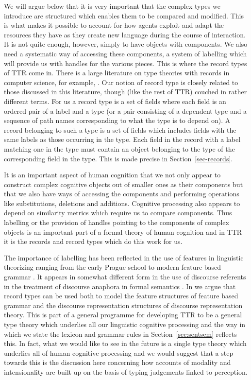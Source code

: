We will argue below that it is very important that the complex types
we introduce are structured which enables them to be compared and
modified.  This is what makes it possible to account for how agents
exploit and adapt the resources they have as they create new language
during the course of interaction.  It is not quite enough, however, simply
to have objects with components.  We also need a systematic way of
accessing these components, a system of labelling which will provide
us with handles for the various pieces.  This is where the record
types of TTR come in.  There is a large literature on type theories
with records in computer science, for example,
\cite{Tasistro1997,Betarte1998,BetarteTasistro1998,CoquandPollackTakeyama2004}.
Our notion of record type is closely related to those discussed in
this literature, though (like the rest of TTR) couched in rather
different terms.  For us a record type is a set of fields where each
field is an ordered pair of a label and a type (or a pair consisting
of a dependent type and a sequence of path names corresponding to what
the type is to depend on).  A record belonging to such a type is a set
of fields which includes fields with the same labels as those occurring
in the type.  Each field in the record with a label matching one in
the type must contain an object belonging to the type of the
corresponding field in the type.  This is made precise in
Section~\ref{sec-records}.

It is an important aspect of human cognition that we not only appear
to construct complex cognitive objects out of smaller ones as their
components but that we also have ways of accessing the components and
performing operations like substitutions, deletions and additions.
Cognitive processing also appears to depend on similarity metrics
which require us to compare components.  Thus labelling or the
provision of handles pointing to the components of complex objects is
an important part of a formal theory of human cognition and in TTR it
is the records and record types which do this work for us.

The importance of labelling has been reflected in the use of features
in linguistic theorizing ranging from the early Prague school
\cite{Trubetzkoy1939} to modern feature based grammar
\cite{Sag:Wasow:ea:03}.  It appears in somewhat different form in the
use of discourse referents in the treatment of discourse anaphora in
formal semantics \cite{KampReyle1993}.  In \cite{Cooper2005a} we argue
that record types can be used both to model the feature structures of
feature based grammar and the discourse representation structures of
discourse representation theory.  This is part of a general programme
for developing TTR to be a general type theory which underlies all our
linguistic cognitive processing and the way in which we state the
lexicon and grammar
rules in Section~\ref{sec:sentsem} reflects this.  In fact, what we
would like to see in the future is a single type theory which
underlies all of human cognitive processing and we would suggest that
a step towards this is
the discussion here concerning how accounts of modality and intensionality are
built up on the basis of typing judgements linked to perception.

